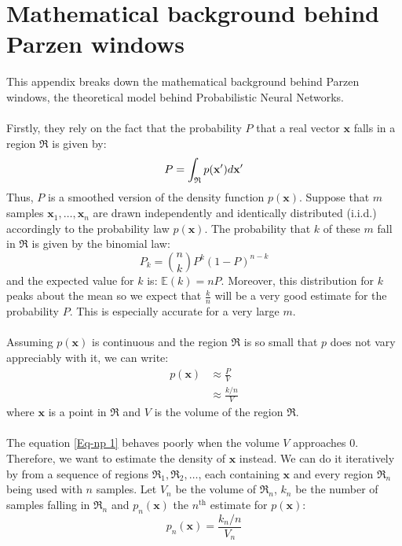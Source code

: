 \chapter{Mathematical background behind Parzen windows} \label{Appendix: Parzen/math-background}

This appendix breaks down the mathematical background behind Parzen windows, the theoretical model behind Probabilistic Neural Networks. 
\\ \\
Firstly, they rely on the fact that the probability $P$ that a real vector $\mathbf{x}$ falls in a region $\mathfrak{R}$ is given by:
\begin{equation}
\centering
P = \int_{\mathfrak{R}} p(\mathbf{x'}) d\mathbf{x'}
\end{equation}
Thus, $P$ is a smoothed version of the density function $p(\mathbf{x})$. Suppose that $m$ samples $\mathbf{x}_1,\dots ,\mathbf{x}_n$ are drawn independently and identically distributed (i.i.d.) accordingly to the probability law $p(\mathbf{x})$. The probability that $k$ of these $m$ fall in $\mathfrak{R}$ is given by the binomial law:
\begin{equation}
P_k = {n\choose k} P^k (1-P)^{n-k}
\end{equation}
and the expected value for $k$ is: $\mathbb{E}(k) = nP$. Moreover, this distribution for $k$ peaks about the mean so we expect that $\frac{k}{n}$ will be a very good estimate for the probability $P$. This is especially accurate for a very large $m$. 
\\ \\
Assuming $p(\mathbf{x})$ is continuous and the region $\mathfrak{R}$ is so small that $p$ does not vary appreciably with it, we can write:
\begin{equation}
\begin{split}
p(\mathbf{x}) &\approx \frac{P}{V} \\
&\approx \frac{k / n}{V}
\end{split}	
\label{Eq-np 1}
\end{equation}
where $\mathbf{x}$ is a point in $\mathfrak{R}$ and $V$ is the volume of the region $\mathfrak{R}$.
\\ \\
The equation \ref{Eq-np 1} behaves poorly when the volume $V$ approaches 0. Therefore, we want to estimate the density of $\mathbf{x}$ instead. We can do it iteratively by from a sequence of regions $\mathfrak{R}_1, \mathfrak{R}_2, \dots$, each containing $\mathbf{x}$ and every region $\mathfrak{R}_n$ being used with $n$ samples. Let $V_n$ be the volume of $\mathfrak{R}_n$, $k_n$ be the number of samples falling in $\mathfrak{R}_n$ and $p_n(\mathbf{x})$ the $n^\text{th}$ estimate for $p(\mathbf{x})$:
\begin{equation}
p_n(\mathbf{x}) = \frac{k_n/n}{V_n}
\label{Eq-np 2}
\end{equation}

